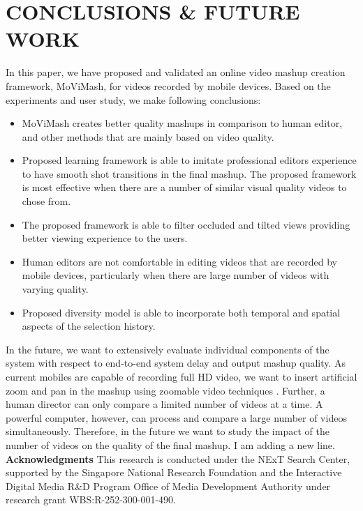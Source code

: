 \documentclass{new}
\begin{document}
\section{ CONCLUSIONS & FUTURE WORK}
In this paper, we have proposed and validated an online video
mashup creation framework, MoViMash, for videos recorded by
mobile devices. Based on the experiments and user study, we make
following conclusions:
\begin{itemize}
  \item MoViMash creates better quality mashups in comparison to
human editor, and other methods that are mainly based on
video quality.
  \item Proposed learning framework is able to imitate professional
editor\textquotesingle s experience to have smooth shot transitions in the final mashup. The proposed framework is most effective when there are a number of similar visual quality videos to chose from.
\item The proposed framework is able to filter occluded and tilted
views providing better viewing experience to the users.
\item Human editors are not comfortable in editing videos that are
recorded by mobile devices, particularly when there are large
number of videos with varying quality.
\item Proposed diversity model is able to incorporate both temporal
and spatial aspects of the selection history.
\end{itemize}
In the future, we want to extensively evaluate individual components
of the system with respect to end-to-end system delay and
output mashup quality. As current mobiles are capable of recording
full HD video, we want to insert artificial zoom and pan in the
mashup using zoomable video techniques \cite{rfc11}. Further, a human
director can only compare a limited number of videos at a time.
A powerful computer, however, can process and compare a large
number of videos simultaneously. Therefore, in the future we want
to study the impact of the number of videos on the quality of the
final mashup.\newline
I am adding a new line. 
\textbf{\large Acknowledgments}\newline
This research is conducted under the NExT Search Center, supported
by the Singapore National Research Foundation and the Interactive
Digital Media R&D Program Office of Media Development
Authority under research grant WBS:R-252-300-001-490.
%
\end{document}
